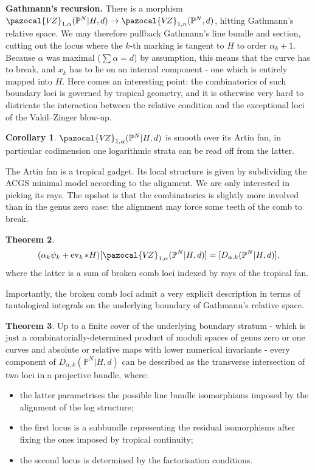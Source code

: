 \documentclass[11pt]{amsart}
\newcommand{\PP}{\mathbb P}
\newcommand{\VZ}{\pazocal{V\!Z}}
\renewcommand{\to}{\rightarrow}
\newcommand{\ev}{\operatorname{ev}}
\theoremstyle{definition}
\newtheorem{thm}{Theorem}[section]
\newtheorem{cor}[thm]{Corollary}
\theoremstyle{definition}
\begin{document}
\textbf{Gathmann's recursion.} There is a morphism $\VZ_{1,\alpha}(\PP^N|H,d)\to \VZ_{1,n}(\PP^N,d)$, hitting Gathmann's relative space. We may therefore pullback Gathmann's line bundle and section, cutting out the locus where the $k$-th marking is tangent to $H$ to order $\alpha_k+1$. Because $\alpha$ was maximal ($\sum\alpha=d$) by assumption, this means that the curve has to break, and $x_k$ has to lie on an internal component - one which is entirely mapped into $H$. Here comes an interesting point: the combinatorics of such boundary loci is governed by tropical geometry, and it is otherwise very hard to districate the interaction between the relative condition and the exceptional loci of the Vakil--Zinger blow-up.
\begin{cor}
 $\VZ_{1,\alpha}(\PP^N|H,d)$ is smooth over its Artin fan, in particular codimension one logarithmic strata can be read off from the latter.
\end{cor}
The Artin fan is a tropical gadget. Its local structure is given by subdividing the ACGS minimal model according to the alignment. We are only interested in picking its rays. The upshot is that the combinatorics is slightly more involved than in the genus zero case: the alignment may force some teeth of the comb to break.
\begin{thm}
 \[(\alpha_k\psi_k+\ev_k*H)[\VZ_{1,\alpha}(\PP^N|H,d)]=[D_{\alpha,k}(\PP^N|H,d)],\]
 where the latter is a sum of broken comb loci indexed by rays of the tropical fan.
\end{thm}
Importantly, the broken comb loci admit a very explicit description in terms of tautological integrals on the underlying boundary of Gathmann's relative space.
\begin{thm}
 Up to a finite cover of the underlying boundary stratum - which is just a combinatorially-determined product of moduli spaces of genus zero or one curves and absolute or relative maps with lower numerical invariants - every component of $D_{\alpha,k}(\PP^N|H,d)$ can be described as the transverse intersection of two loci in a projective bundle, where:
 \begin{itemize}
  \item the latter parametrises the possible line bundle isomorphisms imposed by the alignment of the log structure;
  \item the first locus is a subbundle representing the residual isomorphisms after fixing the ones imposed by tropical continuity;
  \item the second locus is determined by the factorisation conditions.
 \end{itemize}
\end{thm}
\end{document}
